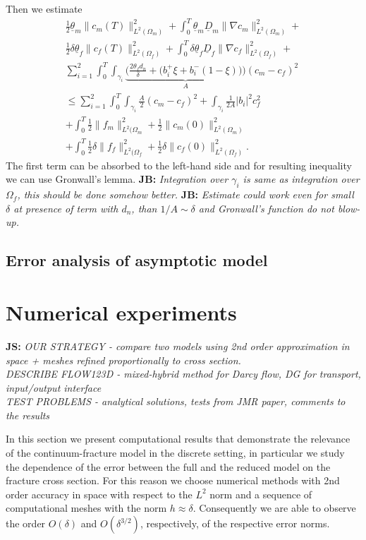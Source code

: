 \documentclass[a4paper]{article}
\def\abs#1{\lvert#1\rvert}
\def\grad{\nabla}
\def\norm#1{\|#1\|}
\newcommand{\note}[2]{{\color{blue} \textbf{ #1:} \textit{#2}}}
\begin{document}
Then we estimate
\def\ul{\underline}
\begin{align*}
  \frac12 \ul{\theta}_m\norm{c_m(T)}_{L^2(\Omega_m)}^2 + \int_0^T \ul{\theta}_m \ul{D}_m \norm{\grad c_m}_{L^2(\Omega_m)}^2 + \\
  \frac12 \delta\ul{\theta}_f\norm{c_f(T)}_{L^2(\Omega_f)}^2 + \int_0^T \delta \ul{\theta}_f \ul{D}_f \norm{\grad c_f}_{L^2(\Omega_f)}^2+\\
   \sum_{i=1}^{2} \int_0^T \int_{\gamma_i} \underbrace{\Big(\frac{2\theta_f d_n}{\delta} + \big(b_i^+ \xi + b_i^-(1-\xi)\big)\Big)}_{A} (c_m-c_f)^2\\
   \le \sum_{i=1}^2 \int_0^T \int_{\gamma_i} \frac{A}{2} (c_m-c_f)^2 + \int_{\gamma_i} \frac{1}{2A}\abs{b_i}^2 c_f^2 \\
   + \int_0^T \frac12\norm{f_m}^2_{L^2(\Omega_m} + \frac12\norm{c_m(0)}^2_{L^2(\Omega_m)}\\
   + \int_0^T \frac12\delta\norm{f_f}^2_{L^2(\Omega_f} + \frac12\delta\norm{c_f(0)}^2_{L^2(\Omega_f)}.
\end{align*}
The first term can be absorbed to the left-hand side and for resulting inequality we can use Gronwall's lemma. 
\note{JB}{Integration over $\gamma_i$ is same as integration over $\Omega_f$, this should be done somehow better.}
\note{JB}{
Estimate could work even for small $\delta$ at presence of term with $d_n$, than $1/A \sim \delta$ and Gronwall's function do not blow-up.}



\subsection{Error analysis of asymptotic model}



\section{Numerical experiments}
\label{sc:numerics}

\note{JS}{
OUR STRATEGY - compare two models using 2nd order approximation in space + meshes refined proportionally to cross section.
\\
DESCRIBE FLOW123D - mixed-hybrid method for Darcy flow, DG for transport, input/output interface
\\
TEST PROBLEMS - analytical solutions, tests from JMR paper, comments to the results
}

In this section we present computational results that demonstrate the relevance of the continuum-fracture model in the discrete setting, in particular we study the dependence of the error between the full and the reduced model on the fracture cross section.
For this reason we choose numerical methods with 2nd order accuracy in space with respect to the $L^2$ norm and a sequence of computational meshes with the norm $h\approx\delta$. Consequently we are able to observe the order $O(\delta)$ and $O(\delta^{3/2})$, respectively, of the respective error norms.
\end{document}
